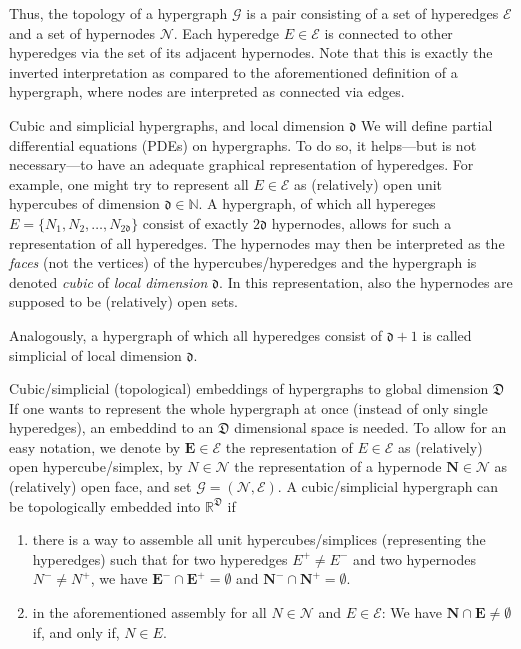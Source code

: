 \documentclass[a4paper, english, 12pt, reqno, draft]{amsart}
\makeatletter
\theoremstyle{definition}
\theoremstyle{remark}
\numberwithin{equation}{section}
\newcommand{\graph}{\ensuremath{\mathcal G}}
\newcommand{\setEdge}{\ensuremath{\mathcal E}}
\newcommand{\setNode}{\ensuremath{\mathcal N}}
\newcommand{\edge}{\ensuremath{E}}
\newcommand{\node}{\ensuremath{N}}
\newcommand{\Graph}{\ensuremath{\boldsymbol{\mathcal G}}}
\newcommand{\SetEdge}{\ensuremath{\boldsymbol{\mathcal E}}}
\newcommand{\SetNode}{\ensuremath{\boldsymbol{\mathcal N}}}
\newcommand{\Edge}{{\ensuremath{\boldsymbol E}}}
\newcommand{\Node}{{\ensuremath{\boldsymbol N}}}
\newcommand{\locDim}{\ensuremath{\mathfrak d}}
\newcommand{\globDim}{\ensuremath{\mathfrak D}}
\newcommand{\IN}{\ensuremath{\mathbb N}}
\newcommand{\IR}{\ensuremath{\mathbb R}}
\def\paragraph{\@startsection{paragraph}{4}%
  \z@\z@{-\fontdimen2\font}%
  {\normalfont\scshape}}
\makeatother
\begin{document}
Thus, the topology of a hypergraph $\graph$ is a pair consisting of a set of hyperedges $\setEdge$ and a set of hypernodes $\setNode$. Each hyperedge $\edge \in \setEdge$ is connected to other hyperedges via the set of its adjacent hypernodes. Note that this is exactly the inverted interpretation as compared to the aforementioned definition of a hypergraph, where nodes are interpreted as connected via edges.

\paragraph{Cubic and simplicial hypergraphs, and local dimension $\locDim$}
% 
We will define partial differential equations (PDEs) on hypergraphs. To do so, it helps---but is not necessary---to have an adequate graphical representation of hyperedges. For example, one might try to represent all $\edge \in \setEdge$ as (relatively) open unit hypercubes of dimension $\locDim \in \IN$. A hypergraph, of which all hypereges $\edge = \{ \node_1, \node_2, \ldots, \node_{2\locDim} \}$ consist of exactly $2\locDim$ hypernodes, allows for such a representation of all hyperedges. The hypernodes may then be interpreted as the \emph{faces} (not the vertices) of the hypercubes/hyperedges and the hypergraph is denoted \emph{cubic} of \emph{local dimension} $\locDim$. In this representation, also the hypernodes are supposed to be (relatively) open sets.

Analogously, a hypergraph of which all hyperedges consist of $\locDim+1$ is called simplicial of local dimension $\locDim$.

\paragraph{Cubic/simplicial (topological) embeddings of hypergraphs to global dimension $\globDim$}
% 
If one wants to represent the whole hypergraph at once (instead of only single hyperedges), an embeddind to an $\globDim$ dimensional space is needed. To allow for an easy notation, we denote by $\Edge \in \SetEdge$ the representation of $\edge \in \setEdge$ as (relatively) open hypercube/simplex, by $\node \in \setNode$ the representation of a hypernode $\Node \in \SetNode$ as (relatively) open face, and set $\Graph = (\SetNode, \SetEdge)$. A cubic/simplicial hypergraph can be topologically embedded into $\IR^\globDim$ if
% 
\begin{enumerate}
 \item there is a way to assemble all unit hypercubes/simplices (representing the hyperedges) such that for two hyperedges $\edge^+ \neq \edge^-$ and two hypernodes $\node^- \neq \node^+$, we have $\Edge^- \cap \Edge^+ = \emptyset$ and $\Node^- \cap \Node^+ = \emptyset$.
 \item in the aforementioned assembly for all $\node \in \setNode$ and $\edge \in \setEdge$: We have $\Node \cap \Edge \neq \emptyset$ if, and only if, $\node \in \edge$.
\end{enumerate}
% 
\end{document}
